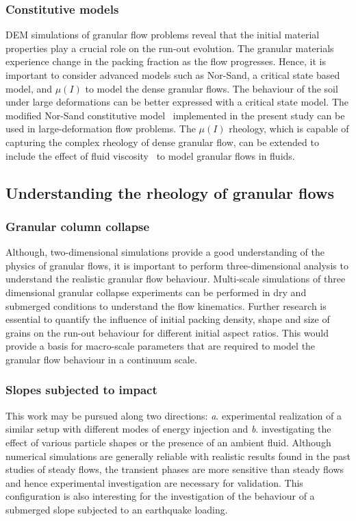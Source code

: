 \subsubsection*{Constitutive models}

DEM simulations of granular flow problems reveal that the initial material 
properties play a crucial role on the run-out evolution. The granular materials 
experience change in the packing fraction as the flow progresses. Hence, it is 
important to consider advanced models such as Nor-Sand, a critical state based 
model, and $\mu(I)$  to model the dense granular flows. The behaviour of the 
soil under large deformations can be better expressed with a critical state 
model. The modified Nor-Sand constitutive model~\citep{Robert2010} implemented 
in the present study can be used in large-deformation flow problems. The 
$\mu(I)$ rheology, which is capable of capturing the complex rheology of dense 
granular flow, can be extended to include the effect of fluid 
viscosity~\citep{Pouliquen2005} to model granular flows in fluids. 


\subsection{Understanding the rheology of granular flows}

\subsubsection*{Granular column collapse}
Although, two-dimensional simulations provide a good understanding of the 
physics of granular flows, it is important to perform three-dimensional 
analysis to understand the realistic granular flow behaviour. Multi-scale 
simulations of three dimensional granular collapse experiments can be performed 
in dry and submerged conditions to understand the flow kinematics. Further 
research is essential to quantify the influence of initial packing density, 
shape and size of grains on the run-out behaviour for different initial aspect 
ratios. This would provide a basis for macro-scale parameters that are required 
to model the granular flow behaviour in a continuum scale.

\subsubsection*{Slopes subjected to impact}
This work may be pursued along two directions: \textit{a}. experimental 
realization of a similar setup with different modes of energy injection and 
\textit{b}. investigating the effect of various particle shapes or the presence 
of an ambient fluid. Although numerical simulations are generally reliable with 
realistic results found in the past studies of steady flows, the transient 
phases are more sensitive than steady flows and hence experimental 
investigation are necessary for validation. This configuration is also 
interesting for the investigation of the behaviour of a submerged slope 
subjected to an earthquake loading.

